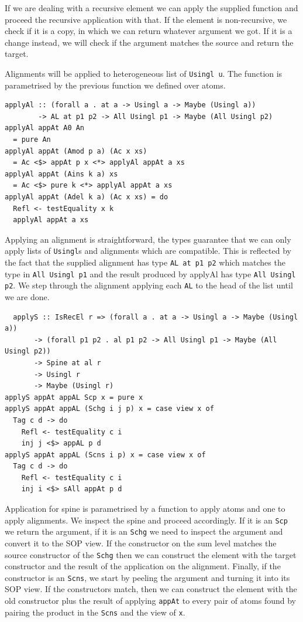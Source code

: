 \documentclass[11pt, titlepage]{article}
\newcommand{\toHaskell}[1]{\texttt{#1}\xspace}
\newcommand{\scp}{\toHaskell{Scp}}
\newcommand{\scns}{\toHaskell{Scns}}
\newcommand{\schg}{\toHaskell{Schg}}
\begin{document}
If we are dealing with a recursive element we can apply the supplied function 
and proceed the recursive application with that.
If the element is non-recursive, we check if it is a copy, in which we can 
return whatever argument we got. If it is a change instead, we will check if the 
argument matches the source and return the target.

Alignments will be applied to heterogeneous list of \texttt{Usingl u}. The function is parametrised by the previous function we defined over atoms.

\begin{verbatim}
applyAl :: (forall a . at a -> Usingl a -> Maybe (Usingl a))
        -> AL at p1 p2 -> All Usingl p1 -> Maybe (All Usingl p2)
applyAl appAt A0 An
  = pure An
applyAl appAt (Amod p a) (Ac x xs)
  = Ac <$> appAt p x <*> applyAl appAt a xs
applyAl appAt (Ains k a) xs
  = Ac <$> pure k <*> applyAl appAt a xs
applyAl appAt (Adel k a) (Ac x xs) = do
  Refl <- testEquality x k
  applyAl appAt a xs
\end{verbatim}

Applying an alignment is straightforward, the types guarantee that we can only 
apply lists of \texttt{Usingl}s and alignments which are compatible. This is 
reflected by the fact that the supplied alignment has type \texttt{AL at p1 p2} 
which matches the type in \texttt{All Usingl p1} and the result produced by 
applyAl has type \texttt{All Usingl p2}. We step through the alignment applying 
each \texttt{AL} to the head of the list until we are done.

\begin{verbatim}
  applyS :: IsRecEl r => (forall a . at a -> Usingl a -> Maybe (Usingl a))
       -> (forall p1 p2 . al p1 p2 -> All Usingl p1 -> Maybe (All Usingl p2))
       -> Spine at al r
       -> Usingl r
       -> Maybe (Usingl r)
applyS appAt appAL Scp x = pure x
applyS appAt appAL (Schg i j p) x = case view x of
  Tag c d -> do
    Refl <- testEquality c i
    inj j <$> appAL p d
applyS appAt appAL (Scns i p) x = case view x of
  Tag c d -> do
    Refl <- testEquality c i
    inj i <$> sAll appAt p d
\end{verbatim}

Application for spine is parametrised by a function to apply atoms and one to 
apply alignments. We inspect the spine and proceed accordingly. If it is an \scp 
we return the argument, if it is an \schg we need to inspect the argument and 
convert it to the SOP view. If the constructor on the sum level matches the 
source constructor of the \schg then we can construct the element with the 
target constructor and the result of the application on the alignment.
Finally, if the constructor is an \scns, we start by peeling the argument and 
turning it into its SOP view. If the constructors match, then we can construct 
the element with the old constructor plus the result of applying \texttt{appAt} 
to every pair of atoms found by pairing the product in the \scns and the view of 
\texttt{x}.
\end{document}
